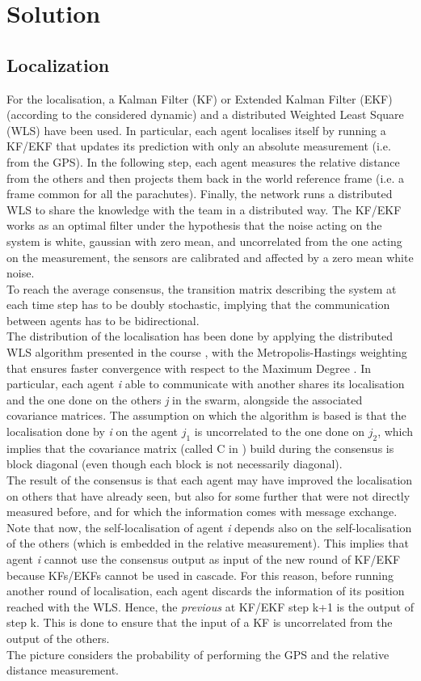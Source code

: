 \section{Solution}\label{sec:solution}
\subsection{Localization}\label{subsec:solution_localization}
For the localisation, a Kalman Filter (KF) or Extended Kalman Filter (EKF) \cite{b12} (according to the considered dynamic) and a distributed Weighted Least Square (WLS) have been used. In particular, each agent localises itself by running a KF/EKF that updates its prediction with only an absolute measurement (i.e. from the GPS). In the following step, each agent measures the relative distance from the others and then projects them back in the world reference frame (i.e. a frame common for all the parachutes). Finally, the network runs a distributed WLS to share the knowledge with the team in a distributed way. The KF/EKF works as an optimal filter under the hypothesis that the noise acting on the system is white, gaussian with zero mean, and uncorrelated from the one acting on the measurement, the sensors are calibrated and affected by a zero mean white noise.\\
 To reach the average consensus, the transition matrix describing the system at each time step has to be doubly stochastic, implying that the communication between agents has to be bidirectional.\\
 The distribution of the localisation has been done by applying the distributed WLS algorithm presented in the course \cite{b13}, with the Metropolis-Hastings weighting that ensures faster convergence with respect to the Maximum Degree \cite{b13}. In particular, each agent \textit{i} able to communicate with another shares its localisation and the one done on the others \textit{j} in the swarm, alongside the associated covariance matrices. The assumption on which the algorithm is based is that the localisation done by \textit{i} on the agent \textit{$j_1$} is uncorrelated to the one done on \textit{$j_2$}, which implies that the covariance matrix (called C in \cite{b13}) build during the consensus is block diagonal (even though each block is not necessarily diagonal). \\
The result of the consensus is that each agent may have improved the localisation on others that have already seen, but also for some further that were not directly measured before, and for which the information comes with message exchange. Note that now, the self-localisation of agent \textit{i} depends also on the self-localisation of the others (which is embedded in the relative measurement). This implies that agent \textit{i} cannot use the consensus output as input of the new round of KF/EKF because KFs/EKFs cannot be used in cascade. For this reason, before running another round of localisation, each agent discards the information of its position reached with the WLS. Hence, the \textit{previous} at KF/EKF step k+1 is the output of step k. This is done to ensure that the input of a KF is uncorrelated from the output of the others.\\
The picture considers the probability of performing the GPS and the relative distance measurement.
